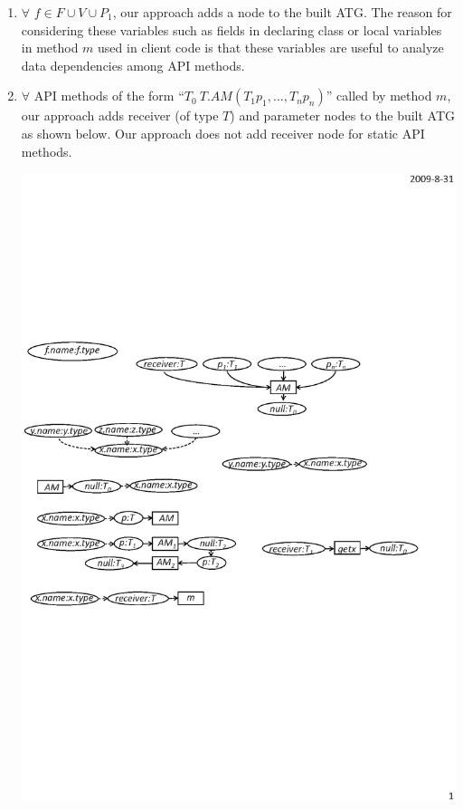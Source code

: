 \begin{enumerate}\vspace*{-2ex}
\item $\forall$ $f \in F \cup V \cup P_1$, our approach adds a node to the built ATG.
The reason for considering these variables such as fields in
declaring class or local variables in method $m$ used in client code
is that these variables are useful to analyze data dependencies
among API methods.\vspace*{-2ex}
\item $\forall$ API methods of the form ``$T_0\ T.AM (T_1 p_1, \ldots, T_n p_n)$''
called by method $m$, our approach adds receiver (of type $T$) and
parameter nodes to the built ATG as shown below. Our approach does
not add receiver node for static API methods. \vspace*{-3ex}
\begin{center}
\includegraphics[scale=0.7,clip]{figure/rule2.eps}%

\end{center}
\end{enumerate}
